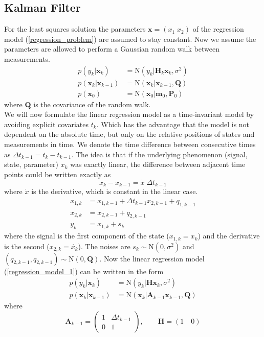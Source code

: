 \subsection{Kalman Filter} \label{KF}
For the least squares solution the parameters
$\mathbf{x} = (x_{1} \; x_{2})$ of
the regression model (\ref{regression_problem}) are assumed to stay constant.
Now we assume the parameters are allowed to perform
a Gaussian random walk between measurements.
\begin{align*}
  p(y_k | \mathbf{x}_k) &= \text{N}(y_k | \mathbf{H}_k \mathbf{x}_k, \sigma^2) \\
  p(\mathbf{x}_k | \mathbf{x}_{k-1}) &= \text{N}(\mathbf{x}_k |
                               \mathbf{x}_{k-1}, \mathbf{Q}) \\
  p(\mathbf{x}_0) &= \text{N}(\mathbf{x}_0 | \mathbf{m}_0, \mathbf{P}_0)
\end{align*}
where $\mathbf{Q}$ is the covariance of the random walk. \\
We will now formulate the
linear regression model as a time-invariant model
by avoiding explicit covariates $t_k$.
Which has the advantage that the model is not dependent on
the absolute time, but only on the relative positions of states
and measurements in time.
We denote the time difference between consecutive times as
$\Delta t_{k-1} = t_k - t_{k-1}$. The idea is that if
the underlying phenomenon (signal, state, parameter) $x_k$ was
exactly linear, the difference between adjacent time points could be
written exactly as
$$ x_k - x_{k-1} = \dot{x} \; \Delta t_{k-1} $$
where $\dot{x}$ is the derivative, which is constant in the linear case.
\begin{align*}
  x_{1,k} &= x_{1,k-1} + \Delta t_{k-1} x_{2,k-1} + q_{1,k-1} \\
  x_{2,k} &= x_{2,k-1} + q_{2,k-1} \\
  y_k &= x_{1,k} + s_k
\end{align*}
where the signal is the first component of the state
($x_{1,k} = x_k$) and the derivative is the second
($x_{2,k} = \dot{x_k}$).
The noises are $s_k \sim \text{N}(0, \sigma^2)$ and
$(q_{2,k-1}, q_{2,k-1}) \sim \text{N}(0,\mathbf{Q})$.
Now the linear regression model (\ref{regression_model_1}) can be written
in the form
\begin{align*}
  p(y_k | \mathbf{x}_k) &= \text{N}(y_k | \mathbf{H}
                          \mathbf{x}_k, \sigma^2) \\
  p(\mathbf{x}_k | \mathbf{x}_{k-1}) &= \text{N}(\mathbf{x}_k |
                                       \mathbf{A}_{k-1} \mathbf{x}_{k-1},
                                       \mathbf{Q})
\end{align*}
where
$$
\mathbf{A}_{k-1} =
\begin{pmatrix}
  1 & \Delta t_{k-1} \\
  0 & 1
\end{pmatrix}, \quad \quad \mathbf{H} = (1 \quad 0)
$$


